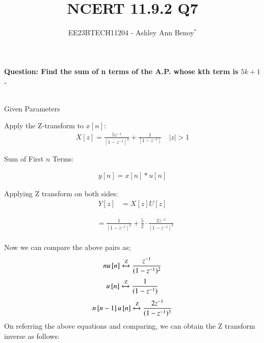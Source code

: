 \documentclass[journal,12pt,twocolumn]{IEEEtran}
\newcommand{\brak}[1]{\left[#1\right]}
\theoremstyle{remark}
\begin{document}

\vspace{3cm}

\title{NCERT 11.9.2 Q7}
\author{EE23BTECH11204 - Ashley Ann Benoy$^{*}$}%
\maketitle
\newpage
\bigskip

\textbf{Question: Find the sum of n terms of the A.P. whose kth term is \(5k + 1\).}\\
\solution
\begin{table}[h!]
    \centering
    \resizebox{6cm}{!}{
        
    }
    \\
    \caption{Given Parameters}
    \label{tab:given_params}  
\end{table}

Apply the Z-transform to \( x\brak{n} \):
\begin{align}
X\brak{z} = \frac{5z^{-1}}{\brak{1 - z^{-1}}^2} + \frac{1}{\brak{1 - z^{-1}}}
\quad |z|>1
\end{align}

Sum of First \( n \) Terms:

\begin{align}
y\brak{n} = x\brak{n} * u\brak{n}
\end{align}

Applying Z transform on both sides:
\begin{align}
    Y\brak{z} &= X\brak{z}U\brak{z}
\end{align}

\begin{align}
&=\frac{1}{\brak{1 - z^{-1}}^2} + \frac{5}{2} \cdot \frac{2z^{-1}}{\brak{1 - z^{-1}}^3} 
\end{align}
\\
Now we can compare the  above pairs as;
\begin{align}
nu\brak{n} \xleftrightarrow{\text{Z}} \frac{z^{-1}}{(1 - z^{-1})^2}
\end{align}
\begin{align}
u\brak{n} \xleftrightarrow{\text{Z}} \frac{1}{(1 - z^{-1})}
\end{align}
\begin{align}
n\brak{n-1}u\brak{n} \xleftrightarrow{\text{Z}} \frac{2z^{-1}}{(1 - z^{-1})^3}
\end{align}
On referring the above equations and comparing, we can obtain the  Z transform inverse as follows:
\end{document}

